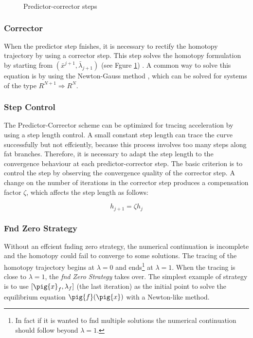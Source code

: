 \documentclass[conference]{IEEEtran}
\begin{document}
\begin{figure}[hbtp]
\centerline{
\epsfxsize=60mm
}
\caption{Predictor-corrector steps}
\label{pcorrector}
\end{figure}

 
\subsubsection{Corrector}

When the predictor step fnishes, it is necessary to
rectify the homotopy trajectory by
using a corrector step. This step  solves the homotopy formulation by starting
from $(\bar{x}^{j+1},\bar{\lambda}_{j+1})$ (see Fgure \ref{pcorrector})
. A common
way to solve this equation is by using the Newton-Gauss method \cite{homo_allgower}, which
can be solved for systems of the type $R^{N+1} \Rightarrow R^N$.

\subsubsection{Step Control}

The Predictor-Corrector scheme can be optimized for tracing acceleration by
using a step length control. A small constant step length
can trace the curve successfully
but not effciently, because this process 
involves too many steps along fat branches.
Therefore, it is necessary to adapt the step length to the
convergence behaviour at each
predictor-corrector step. The basic criterion is to control
the step by observing the
convergence quality of the corrector step. A change on
the number of iterations in the corrector step produces
a compensation factor $\zeta$, which affects the step length as follows:


\begin{displaymath}
h_{j+1}=\zeta h_{j}
\label{zero}
\end{displaymath}


\subsubsection{Fnd Zero Strategy}

Without an effcient fnding zero strategy,
the numerical continuation is incomplete and the homotopy could fail
to converge to some solutions.
The tracing of the homotopy trajectory begins at $\lambda=0$ and
ends\footnote{In fact if it is wanted to fnd multiple
solutions the numerical continuation
should follow beyond $\lambda=1$.} at $\lambda=1$. When the tracing is
close to $\lambda=1$, the {\it fnd Zero Strategy} takes over.
The simplest example
of strategy is to use $[\pig{x}_f,\lambda_f]$ (the last iteration) as the initial point
to solve the equilibrium equation $\pig{f}(\pig{x})$ with a Newton-like method. 
\end{document}
